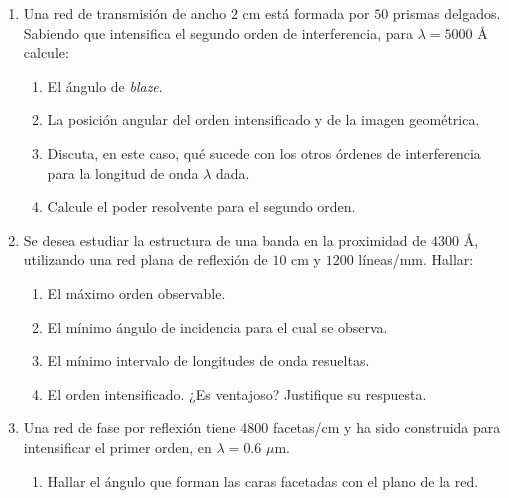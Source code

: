 \documentclass[11pt,spanish]{article}
\begin{document}
\begin{enumerate}

    \item Una red de transmisión de ancho $2$ cm está formada por $50$ prismas
    delgados. Sabiendo que intensifica el segundo orden de interferencia, para
    $\lambda=5000$ Å calcule: 

    \begin{enumerate}
        \item El ángulo de \textit{blaze}.

        \item La posición angular del orden intensificado y de la imagen geométrica.

        \item Discuta, en este caso, qué sucede con los otros órdenes de interferencia
        para la longitud de onda $\lambda$ dada.

        \item Calcule el poder resolvente para el segundo orden. 
    \end{enumerate}

    
    \item Se desea estudiar la estructura de una banda en la proximidad de $4300$
    Å, utilizando una red plana de reflexión de $10$ cm y $1200$ líneas/mm.
    Hallar:
    
    \begin{enumerate}
        \item El máximo orden observable.

        \item El mínimo ángulo de incidencia para el cual se observa.

        \item El mínimo intervalo de longitudes de onda resueltas.

        \item El orden intensificado. ¿Es ventajoso? Justifique su respuesta.
    \end{enumerate}


    \item Una red de fase por reflexión tiene $4800$ facetas/cm y ha sido construida
    para intensificar el primer orden, en $\lambda=0.6$ $\mu$m. 

    \begin{enumerate}
        \item Hallar el ángulo que forman las caras facetadas con el plano de la
        red.


\end{enumerate}
\end{enumerate}
\end{document}
